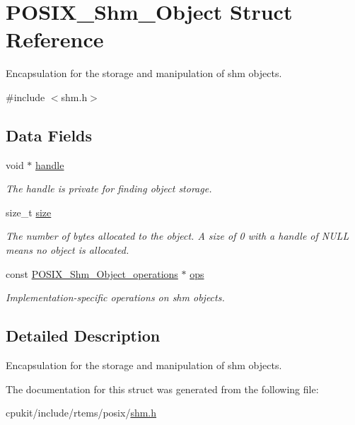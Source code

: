 \hypertarget{structPOSIX__Shm__Object}{}\section{P\+O\+S\+I\+X\+\_\+\+Shm\+\_\+\+Object Struct Reference}
\label{structPOSIX__Shm__Object}


Encapsulation for the storage and manipulation of shm objects.  




{\ttfamily \#include $<$shm.\+h$>$}

\subsection*{Data Fields}
\begin{DoxyCompactItemize}
\item 
\mbox{\label{structPOSIX__Shm__Object_a49a4ccba266d8c93f23206b3ac3e8094}} 
void $\ast$ \mbox{\hyperlink{structPOSIX__Shm__Object_a49a4ccba266d8c93f23206b3ac3e8094}{handle}}
\begin{DoxyCompactList}\small\item\em The handle is private for finding object storage. \end{DoxyCompactList}\item 
\mbox{\label{structPOSIX__Shm__Object_a363a5a47944002a5d3dfb51e9494fb71}} 
size\+\_\+t \mbox{\hyperlink{structPOSIX__Shm__Object_a363a5a47944002a5d3dfb51e9494fb71}{size}}
\begin{DoxyCompactList}\small\item\em The number of bytes allocated to the object. A size of 0 with a handle of N\+U\+LL means no object is allocated. \end{DoxyCompactList}\item 
\mbox{\label{structPOSIX__Shm__Object_aadb2036d11c26a7ccd5a4cf28391a01e}} 
const \mbox{\hyperlink{structPOSIX__Shm__Object__operations}{P\+O\+S\+I\+X\+\_\+\+Shm\+\_\+\+Object\+\_\+operations}} $\ast$ \mbox{\hyperlink{structPOSIX__Shm__Object_aadb2036d11c26a7ccd5a4cf28391a01e}{ops}}
\begin{DoxyCompactList}\small\item\em Implementation-\/specific operations on shm objects. \end{DoxyCompactList}\end{DoxyCompactItemize}


\subsection{Detailed Description}
Encapsulation for the storage and manipulation of shm objects. 

The documentation for this struct was generated from the following file\+:\begin{DoxyCompactItemize}
\item 
cpukit/include/rtems/posix/\mbox{\hyperlink{shm_8h}{shm.\+h}}\end{DoxyCompactItemize}
